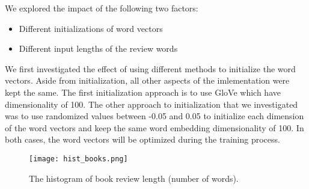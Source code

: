 \documentclass[conference,compsoc]{IEEEtran}
\begin{document}
We explored the impact of the following two factors:
\begin{itemize}
\item Different initializations of word vectors
\item Different input lengths of the review words
\end{itemize}
We first investigated the effect of using different methods to initialize the word vectors. Aside from initialization, all other aspects of the imlementation were kept the same. The first initialization approach is to use GloVe which have dimensionality of 100. %
The other approach to initialization that we investigated was to use randomized values between -0.05 and 0.05 to initialize each dimension of the word vectors and keep the same word embedding dimensionality of 100. In both cases, the word vectors will be optimized during the training process.
\begin{figure}[t]
	\graphicspath{ {./figures/} }
	\centering
	\texttt{[image: hist\_books.png]}
	\caption{The histogram of book review length (number of words).}
	\label{fig:hist_length}
\end{figure}%
\end{document}
